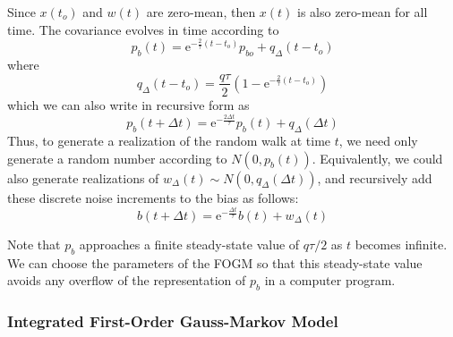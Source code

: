 Since $x(t_o)$ and $w(t)$ are zero-mean, then $x(t)$ is also zero-mean for all time.  The covariance evolves in time according to
\begin{equation}
	p_b(t) = \text{e}^{-\frac{2}{\tau}(t-t_o)}p_{bo} + q_\Delta(t-t_o)
\end{equation}
where
\begin{equation}
	q_\Delta(t-t_o) = \frac{q\tau}{2}\left(1-\text{e}^{-\frac{2}{\tau}(t-t_o)}\right)
\end{equation}
which we can also write in recursive form as
\begin{equation}
	p_b(t+\Delta t) = \text{e}^{-\frac{2\Delta t}{\tau}}p_b(t) + q_\Delta(\Delta t)
\end{equation}
Thus, to generate a realization of the random walk at time $t$, we need only generate a random number according to $N(0, p_b(t))$.  Equivalently, we could also generate realizations of $w_\Delta(t) \sim N(0, q_\Delta(\Delta t))$, and recursively add these discrete noise increments to the bias as follows:
\begin{equation}
	 b(t+\Delta t) = \text{e}^{-\frac{\Delta t}{\tau}}b(t) + w_\Delta(t)
\end{equation}

Note that $p_b$ approaches a finite steady-state value of $q\tau/2$ as $t$ becomes infinite.  We can choose the parameters of the FOGM so that this steady-state value avoids any overflow of the representation of $p_b$ in a computer program.

\subsubsection{Integrated First-Order Gauss-Markov Model}

